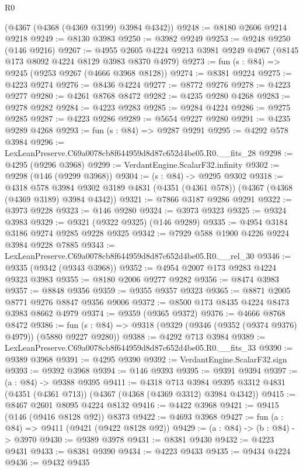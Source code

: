 \begin{lexlean}{R0}
\begin{coremodule}
    (@4367 (@4368 (@4369 @3199) @3984 @4342))
@9248 := @8180 @2606 @9214 @9218
@9249 := @8130 @3983
@9250 := @3982 @9249
@9253 := @9248 @9250 (@146 @9216)
@9267 := @4955 @2605 @4224 @9213 @3981 @9249 @4967 (@8145 @173 @8092 @4224 @8129 @3983 @8370 @4979)
@9273 := fun (s : @84) => @9245 (@9253 @9267 (@4666 @3968 @8128))
@9274 := @8381 @9224
@9275 := @4223 @9274
@9276 := @8436 @4224
@9277 := @8772 @9276
@9278 := @4223 @9277
@9280 := @4261 @8768 @8472
@9282 := @4235 @9280 @4268
@9283 := @9278 @9282
@9284 := @4223 @9283
@9285 := @9284 @4224
@9286 := @9275 @9285
@9287 := @4223 @9286
@9289 := @5654 @9227 @9280
@9291 := @4235 @9289 @4268
@9293 := fun (s : @84) => @9287 @9291
@9295 := @4292 @578 @3984
@9296 := LexLeanPreserve.C69a0078cb8f644959d8d87c652d4be05.R0.__fits_28
@9298 := @4295 (@9296 @3968)
@9299 := VerdantEngine.ScalarF32.infinity
@9302 := @9298 (@146 (@9299 @3968))
@9304 := (s : @84) -> @9295 @9302
@9318 := @4318
    @578
    @3984
    @9302
    @3189
    @4831
    (@4351 (@4361 @578))
    (@4367 (@4368 (@4369 @3189) @3984 @4342))
@9321 := @7866 @3187 @9286 @9291
@9322 := @3973 @9228
@9323 := @146 @9280
@9324 := @3973 @9323
@9325 := @9324 @3983
@9329 := @9321 (@9322 @9325) (@146 @9289)
@9335 := @4954 @3184 @3186 @9274 @9285 @9228 @9325
@9342 := @7929 @588 @1900 @4226 @9224 @3984 @9228 @7885
@9343 := LexLeanPreserve.C69a0078cb8f644959d8d87c652d4be05.R0.__rel_30
@9346 := @9335 (@9342 (@9343 @3968))
@9352 := @4954 @2007 @173 @9283 @4224 @9323 @3983
@9355 := @8180 @2006 @9277 @9282
@9356 := @8474 @3983
@9357 := @8848 @9356
@9359 := @9355 @9357 @9323
@9365 := @8871 @2005 @8771 @9276 @8847 @9356 @9006
@9372 := @8500 @173 @8435 @4224 @8473 @3983 @8662 @4979
@9374 := @9359 (@9365 @9372)
@9376 := @4666 @8768 @8472
@9386 := fun (s : @84) => @9318 (@9329 (@9346 (@9352 (@9374 @9376) @4979)) (@5880 @9227 @9280))
@9388 := @4292 @713 @3984
@9389 := LexLeanPreserve.C69a0078cb8f644959d8d87c652d4be05.R0.__fits_33
@9390 := @9389 @3968
@9391 := @4295 @9390
@9392 := VerdantEngine.ScalarF32.sign
@9393 := @9392 @3968
@9394 := @146 @9393
@9395 := @9391 @9394
@9397 := (a : @84) -> @9388 @9395
@9411 := @4318
    @713
    @3984
    @9395
    @3312
    @4831
    (@4351 (@4361 @713))
    (@4367 (@4368 (@4369 @3312) @3984 @4342))
@9415 := @8467 @2601 @8095 @4224 @8132
@9416 := @4422 @3968
@9421 := @9415 (@146 (@9416 @8128 @92)) @8373
@9422 := @4693 @3968
@9427 := fun (a : @84) => @9411 (@9421 (@9422 @8128 @92))
@9429 := (a : @84) -> (b : @84) -> @3970
@9430 := @9389 @3978
@9431 := @8381 @9430
@9432 := @4223 @9431
@9433 := @8381 @9390
@9434 := @4223 @9433
@9435 := @9434 @4224
@9436 := @9432 @9435

\end{coremodule}
\end{lexlean}
